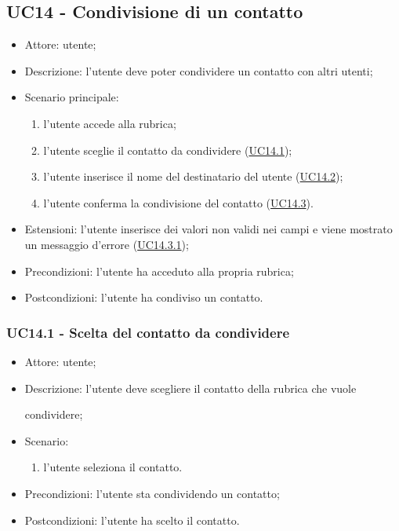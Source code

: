 \subsection{UC14 - Condivisione di un contatto}
\begin{itemize}
    \item Attore: utente;
    \item Descrizione: l'utente deve poter condividere un contatto con altri utenti;
    \item Scenario principale:
        \begin{enumerate}
        \item l'utente accede alla rubrica;
        \item l'utente sceglie il contatto da condividere (\hyperref[sec: UC14.1]{UC14.1});
        \item l'utente inserisce il nome del destinatario del utente (\hyperref[sec: UC14.2]{UC14.2});
        \item l'utente conferma la condivisione del contatto (\hyperref[sec: UC14.3]{UC14.3}).
        \end{enumerate}
    \item Estensioni: l'utente inserisce dei valori non validi nei campi e viene mostrato un messaggio d'errore (\hyperref[sec: UC14.3.1]{UC14.3.1});
    \item Precondizioni: l'utente ha acceduto alla propria rubrica;
    \item Postcondizioni: l'utente ha condiviso un contatto.
\end{itemize}

\subsubsection{UC14.1 - Scelta del contatto da condividere} \label{sec: UC14.1}
\begin{itemize}
    \item Attore: utente;
    \item Descrizione: l'utente deve scegliere il contatto della rubrica che vuole \par condividere;
    \item Scenario:
        \begin{enumerate}
        \item l'utente seleziona il contatto.
        \end{enumerate}
    
    \item Precondizioni: l'utente sta condividendo un contatto;
    \item Postcondizioni: l'utente ha scelto il contatto.
\end{itemize}


